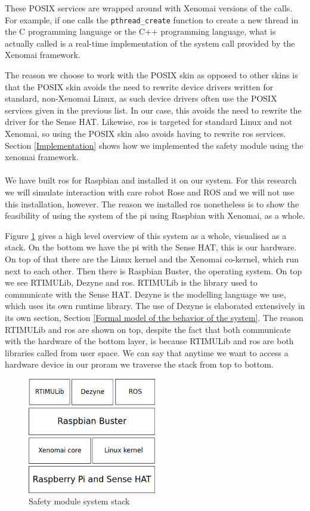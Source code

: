 \documentclass[12pt]{scrreprt}
\begin{document}
These POSIX services are wrapped around with Xenomai versions of the calls. For example, if one calls the \texttt{pthread_create} function to create a new thread in the C programming language or the C++ programming language, what is actually called is a real-time implementation of the system call provided by the Xenomai framework.
\par
The reason we choose to work with the POSIX skin as opposed to other skins is that the POSIX skin avoids the need to rewrite device drivers written for standard, non-Xenomai Linux, as such device drivers often use the POSIX services given in the previous list. In our case, this avoids the need to rewrite the driver for the Sense HAT. Likewise, \acrshort{ros} is targeted for standard Linux and not Xenomai, so using the POSIX skin also avoids having to rewrite \acrshort{ros} services. Section \ref{Implementation} shows how we implemented the safety module using the xenomai framework.
\\\\
We have built \acrshort{ros} for Raspbian and installed it on our system. For this research we will simulate interaction with care robot Rose and ROS and we will not use this installation, however. The reason we installed \acrshort{ros} nonetheless is to show the feasibility of using the system of the \gls{pi} using Raspbian with Xenomai, as a whole.
\par
Figure \ref{fig:stack} gives a high level overview of this system as a whole, visualised as a stack. On the bottom we have the \gls{pi} with the Sense HAT, this is our hardware. On top of that there are the Linux kernel and the Xenomai co-kernel, which run next to each other. Then there is Raspbian Buster, the operating system. On top we see RTIMULib, Dezyne and \acrshort{ros}. RTIMULib is the library used to communicate with the Sense HAT. Dezyne is the modelling language we use, which uses its own runtime library. The use of Dezyne is elaborated extensively in its own section, Section \ref{Formal model of the behavior of the system}. The reason RTIMULib and \acrshort{ros} are shown on top, despite the fact that both communicate with the hardware of the bottom layer, is because RTIMULib and \acrshort{ros} are both libraries called from user space. We can say that anytime we want to access a hardware device in our proram we traverse the stack from top to bottom.

\begin{figure}[H]
    \centering
    \includegraphics[width=0.5\textwidth]{Figures/results/os_environment_stack.png}
    \caption{Safety module system stack}
    \label{fig:stack}
\end{figure}
\end{document}
